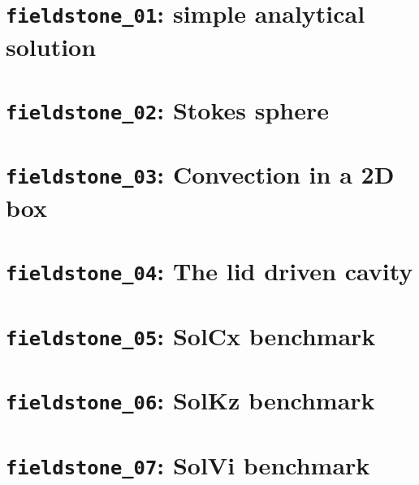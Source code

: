 \documentclass[a4paper]{article}
\begin{document}
\newpage
\section{{\tt fieldstone\_01}: simple analytical solution \label{f01}}


\newpage
\section{{\tt fieldstone\_02}: Stokes sphere \label{f02}}


\newpage
\section{{\tt fieldstone\_03}: Convection in a 2D box \label{f03}}


\newpage
\section{{\tt fieldstone\_04}: The lid driven cavity \label{f04}}



\newpage
\section{{\tt fieldstone\_05}: SolCx benchmark \label{f05}}


\newpage
\section{{\tt fieldstone\_06}: SolKz benchmark \label{f06}}


\newpage
\section{{\tt fieldstone\_07}: SolVi benchmark \label{f07}}

\end{document}
